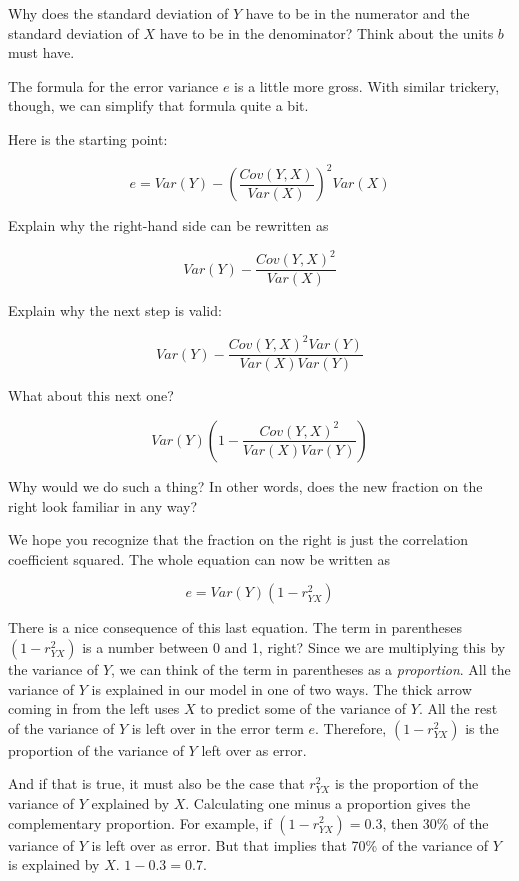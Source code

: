 \documentclass[
]{book}
\begin{document}
Why does the standard deviation of \(Y\) have to be in the numerator and the standard deviation of \(X\) have to be in the denominator? Think about the units \(b\) must have.

The formula for the error variance \(e\) is a little more gross. With similar trickery, though, we can simplify that formula quite a bit.

Here is the starting point:

\[
e = Var(Y) - \left( \frac{Cov(Y, X)}{Var(X)} \right)^2 Var(X)
\]

Explain why the right-hand side can be rewritten as

\[
Var(Y) - \frac{Cov(Y, X)^{2}}{Var(X)}
\]

Explain why the next step is valid:

\[
Var(Y) - \frac{Cov(Y, X)^{2} Var(Y)}{Var(X) Var(Y)}
\]

What about this next one?

\[
Var(Y) \left( 1 - \frac{Cov(Y, X)^{2}}{Var(X) Var(Y)} \right)
\]

Why would we do such a thing? In other words, does the new fraction on the right look familiar in any way?

We hope you recognize that the fraction on the right is just the correlation coefficient squared. The whole equation can now be written as

\[
e = Var(Y) \left( 1 - r_{YX}^2 \right)
\]

There is a nice consequence of this last equation. The term in parentheses \(\left( 1 - r_{YX}^2 \right)\) is a number between 0 and 1, right? Since we are multiplying this by the variance of \(Y\), we can think of the term in parentheses as a \emph{proportion}. All the variance of \(Y\) is explained in our model in one of two ways. The thick arrow coming in from the left uses \(X\) to predict some of the variance of \(Y\). All the rest of the variance of \(Y\) is left over in the error term \(e\). Therefore, \(\left( 1 - r_{YX}^2 \right)\) is the proportion of the variance of \(Y\) left over as error.

And if that is true, it must also be the case that \(r_{YX}^2\) is the proportion of the variance of \(Y\) explained by \(X\). Calculating one minus a proportion gives the complementary proportion. For example, if \(\left( 1 - r_{YX}^2 \right) = 0.3\), then 30\% of the variance of \(Y\) is left over as error. But that implies that 70\% of the variance of \(Y\) is explained by \(X\). \(1 - 0.3 = 0.7\).
\end{document}
